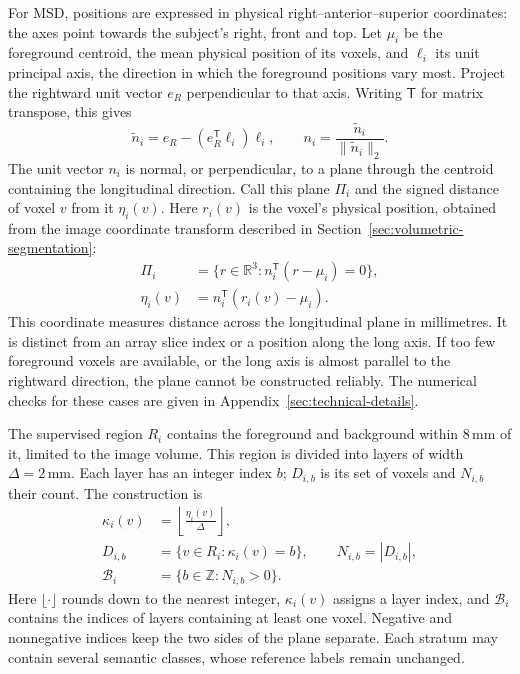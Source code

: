 \documentclass[12pt,a4paper]{article}
\begin{document}
For MSD, positions are expressed in physical right--anterior--superior
coordinates: the axes point towards the subject's right, front and top.
Let $\mu_i$ be the foreground centroid, the mean physical position of its
voxels, and $\ell_i$ its unit principal axis, the direction in which the
foreground positions vary most.
Project the rightward unit vector $e_R$ perpendicular to that axis.
Writing $\mathsf T$ for matrix transpose, this gives
\begin{equation}
\widetilde n_i=e_R-(e_R^{\mathsf T}\ell_i)\ell_i,
\qquad
n_i=\frac{\widetilde n_i}{\|\widetilde n_i\|_2}.
\label{eq:depth-plane-normal}
\end{equation}
The unit vector $n_i$ is normal, or perpendicular, to a plane through
the centroid containing the longitudinal direction. Call this plane
$\Pi_i$ and the signed distance of voxel $v$ from it $\eta_i(v)$.
Here $r_i(v)$ is the voxel's physical position, obtained from the image
coordinate transform described in Section~\ref{sec:volumetric-segmentation}:
\begin{equation}
\begin{aligned}
\Pi_i&=\{r\in\mathbb{R}^{3}:n_i^{\mathsf T}(r-\mu_i)=0\},\\
\eta_i(v)&=n_i^{\mathsf T}(r_i(v)-\mu_i).
\end{aligned}
\label{eq:depth-plane-coordinate}
\end{equation}
This coordinate measures distance across the longitudinal plane in
millimetres. It is distinct from an array slice index or a position
along the long axis. If too few foreground voxels are available, or the
long axis is almost parallel to the rightward direction, the plane cannot
be constructed reliably. The numerical checks for these cases are given
in Appendix~\ref{sec:technical-details}.

The supervised region $R_i$ contains the foreground and background
within $8\,\mathrm{mm}$ of it, limited to the image volume. This region
is divided into layers of width $\Delta=2\,\mathrm{mm}$. Each layer
has an integer index $b$; $D_{i,b}$ is its set of voxels and $N_{i,b}$
their count. The construction is
\begin{equation}
\begin{aligned}
\kappa_i(v)&=\left\lfloor\frac{\eta_i(v)}{\Delta}\right\rfloor,\\
D_{i,b}&=\{v\in R_i:\kappa_i(v)=b\},
\qquad N_{i,b}=|D_{i,b}|,\\
\mathcal{B}_i&=\{b\in\mathbb{Z}:N_{i,b}>0\}.
\end{aligned}
\label{eq:depth-strata}
\end{equation}
Here $\lfloor\cdot\rfloor$ rounds down to the nearest integer,
$\kappa_i(v)$ assigns a layer index, and $\mathcal B_i$ contains the
indices of layers containing at least one voxel. Negative and nonnegative
indices keep the two sides of the plane separate.
Each stratum may contain several semantic classes, whose reference
labels remain unchanged.
\end{document}
